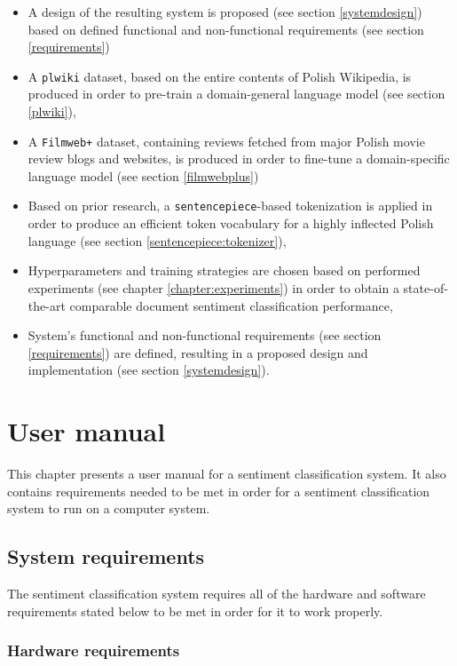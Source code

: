 \begin{itemize}
    \item A design of the resulting system is proposed (see section \ref{systemdesign}) based on defined functional and non-functional requirements (see section \ref{requirements})
    \item A \lstinline{plwiki} dataset, based on the entire contents of Polish Wikipedia, is produced in order to pre-train a domain-general language model (see section \ref{plwiki}),
    \item A \lstinline{Filmweb+} dataset, containing reviews fetched from major Polish movie review blogs and websites, is produced in order to fine-tune a domain-specific language model (see section \ref{filmwebplus})
    \item Based on prior research, a \lstinline{sentencepiece}-based tokenization is applied in order to produce an efficient token vocabulary for a highly inflected Polish language (see section \ref{sentencepiece:tokenizer}),
    \item Hyperparameters and training strategies are chosen based on performed experiments (see chapter \ref{chapter:experiments}) in order to obtain a state-of-the-art comparable document sentiment classification performance,
    \item System's functional and non-functional requirements (see section \ref{requirements}) are defined, resulting in a proposed design and implementation (see section \ref{systemdesign}).
\end{itemize}


\chapter{User manual}
\label{chapter:usermanual}

This chapter presents a user manual for a sentiment classification system. It also contains requirements needed to be met in order for a sentiment classification system to run on a computer system.

\section{System requirements}

The sentiment classification system requires all of the hardware and software requirements stated below to be met in order for it to work properly.

\subsection{Hardware requirements}

